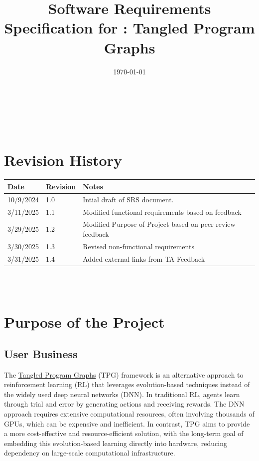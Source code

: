\documentclass[12pt]{article}
\begin{document}
\title{Software Requirements Specification for \progname: Tangled Program Graphs} 
\author{\authname}
\date{\today}
	
\maketitle

~\newpage


\tableofcontents

~\newpage

\section*{Revision History}

\begin{tabularx}{\textwidth}{p{3cm}p{2cm}X}
\toprule {\textbf{Date}} & {\textbf{Revision}} & {\textbf{Notes}}\\
\midrule
10/9/2024 & 1.0 & Intial draft of SRS document.\\
3/11/2025 & 1.1 & Modified functional requirements based on feedback\\
3/29/2025 & 1.2 & Modified Purpose of Project based on peer review feedback\\
3/30/2025 & 1.3 & Revised non-functional requirements\\
3/31/2025 & 1.4 & Added external links from TA Feedback\\
\bottomrule
\end{tabularx}

~\\

~\newpage
\section{Purpose of the Project}
\subsection{User Business}
The \href{https://gitlab.cas.mcmaster.ca/kellys32/tpg}{Tangled Program Graphs} (TPG) framework is an alternative approach to reinforcement learning (RL) that leverages evolution-based techniques instead of the widely used deep neural networks (DNN). In traditional RL, agents learn through trial and error by generating actions and receiving rewards. The DNN approach requires extensive computational resources, often involving thousands of GPUs, which can be expensive and inefficient. In contrast, TPG aims to provide a more cost-effective and resource-efficient solution, with the long-term goal of embedding this evolution-based learning directly into hardware, reducing dependency on large-scale computational infrastructure.
\end{document}
